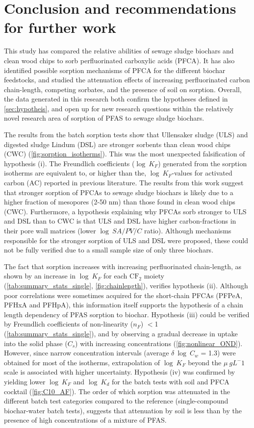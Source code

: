 \chapter{Conclusion and recommendations for further work}\label{chap:Conclusion}
This study has compared the relative abilities of sewage sludge biochars and clean wood chips to sorb perfluorinated carboxylic acids (PFCA). It has also identified possible sorption mechanisms of PFCA for the different biochar feedstocks, and studied the attenuation effects of increasing perfluorinated carbon chain-length, competing sorbates, and the presence of soil on sorption. Overall, the data generated in this research both confirm the hypotheses defined in \cref{sec:hypotheis}, and open up for new research questions within the relatively novel research area of sorption of PFAS to sewage sludge biochars.

The results from the batch sorption tests show that Ullensaker sludge (ULS) and digested sludge Lindum (DSL) are stronger sorbents than clean wood chips (CWC) (\cref{fig:sorption_isotherms}). This was the most unexpected falsification of hypothesis (i). The Freundlich coefficients ($\log~K_F$) generated from the sorption isotherms are equivalent to, or higher than the, $\log~K_F$-values for activated carbon (AC) reported in previous literature. The results from this work suggest that stronger sorption of PFCAs to sewage sludge biochars is likely due to a higher fraction of mesopores (2-50 nm) than those found in clean wood chips (CWC). Furthermore, a hypothesis explaining why PFCAs sorb stronger to ULS and DSL than to CWC is that ULS and DSL have higher carbon-fractions in their pore wall matrices (lower $\log~SA/PV/C$ ratio). Although mechanisms responsible for the stronger sorption of ULS and DSL were proposed, these could not be fully verified due to a small sample size of only three biochars. 

The fact that sorption increases with increasing perfluorinated chain-length, as shown by an increase in $\log~K_F$ for each $\mathrm{CF_2}$ moiety (\cref{tab:summary_stats_single}, \cref{fig:chainlength}), verifies hypothesis (ii). Although poor correlations were sometimes acquired for the short-chain PFCAs (PFPeA, PFHxA and PFHpA), this information itself supports the hypothesis of a chain length dependency of PFAS sorption to biochar. Hypothesis (iii) could be verified by Freundlich coefficients of non-linearity ($n_F$) $<$1 (\cref{tab:summary_stats_single}), and by observing a gradual decrease in uptake into the solid phase ($C_s$) with increasing concentrations (\cref{fig:nonlinear_OND}). However, since narrow concentration intervals (average $\delta~\log~C_w$ = 1.3) were obtained for most of the isotherms, extrapolation of $\log~K_F$ beyond the $\mu~g L^-1$ scale is associated with higher uncertainty. Hypothesis (iv) was confirmed by yielding lower $\log~K_F$ and $\log~K_d$ for the batch tests with soil and PFCA cocktail (\cref{fig:C10_AF}). The order of which sorption was attenuated in the different batch test categories compared to the reference (single-compound biochar-water batch tests), suggests that attenuation by soil is less than by the presence of high concentrations of a mixture of PFAS. 

